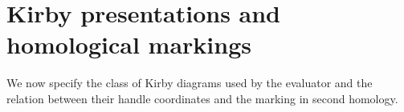 \section{Kirby presentations and homological markings}
\label{sec:kirby-presentations}

We now specify the class of Kirby diagrams used by the evaluator and the
relation between their handle coordinates and the marking in second homology.


